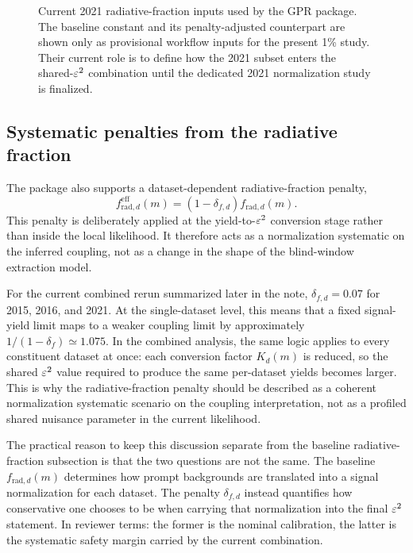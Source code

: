 \begin{figure}[H]
\centering
{}
\caption{Current 2021 radiative-fraction inputs used by the GPR package. The baseline
constant and its penalty-adjusted counterpart are shown only as provisional workflow
inputs for the present 1\% study. Their current role is to define how the 2021 subset
enters the shared-$\varepsilon^2$ combination until the dedicated 2021 normalization study is
finalized.}
\label{fig:2021-radfrac}
\end{figure}

\subsection{Systematic penalties from the radiative fraction}
\label{sec:radfrac-penalty}

The package also supports a dataset-dependent radiative-fraction penalty,
\begin{equation}
f_{\mathrm{rad},d}^{\mathrm{eff}}(m)
= \left(1-\delta_{f,d}\right) f_{\mathrm{rad},d}(m).
\label{eq:frad-penalty}
\end{equation}
This penalty is deliberately applied at the yield-to-$\varepsilon^2$ conversion stage rather
than inside the local likelihood. It therefore acts as a normalization systematic on
the inferred coupling, not as a change in the shape of the blind-window extraction
model.

For the current combined rerun summarized later in the note,
$\delta_{f,d}=0.07$ for 2015, 2016, and 2021. At the single-dataset level, this means
that a fixed signal-yield limit maps to a weaker coupling limit by approximately
$1/(1-\delta_f)\simeq 1.075$. In the combined analysis, the same logic applies to
every constituent dataset at once: each conversion factor $K_d(m)$ is reduced, so the
shared $\varepsilon^2$ value required to produce the same per-dataset yields becomes larger.
This is why the radiative-fraction penalty should be described as a coherent
normalization systematic scenario on the coupling interpretation, not as a profiled
shared nuisance parameter in the current likelihood.

The practical reason to keep this discussion separate from the baseline
radiative-fraction subsection is that the two questions are not the same. The baseline
$f_{\mathrm{rad},d}(m)$ determines how prompt backgrounds are translated into a signal
normalization for each dataset. The penalty $\delta_{f,d}$ instead quantifies how
conservative one chooses to be when carrying that normalization into the final
$\varepsilon^2$ statement. In reviewer terms: the former is the nominal calibration, the
latter is the systematic safety margin carried by the current combination.

